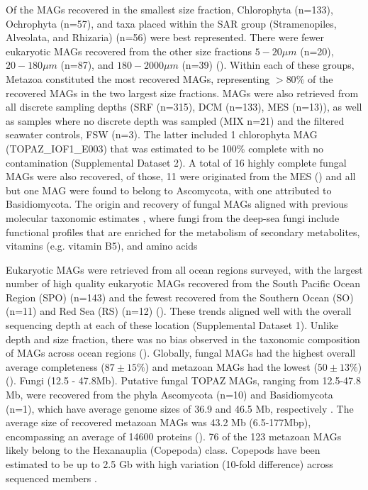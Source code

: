 \documentclass[12pt]{article}
\numberwithin{equation}{section}
\begin{document}
Of the MAGs recovered in the smallest size fraction,  Chlorophyta (n=133), Ochrophyta (n=57), and taxa placed within the SAR group (Stramenopiles, Alveolata, and Rhizaria) (n=56) were best represented. There were fewer eukaryotic MAGs recovered from the other size fractions $5-20\mu m$ (n=20), $20-180 \mu m$ (n=87), and $180-2000\mu m$ (n=39) (). Within each of these groups, Metazoa constituted the most recovered MAGs, representing $>80\%$ of the recovered MAGs in the two largest size fractions. MAGs were also retrieved from all discrete sampling depths (SRF (n=315), DCM (n=133), MES (n=13)), as well as samples where no discrete depth was sampled (MIX n=21) and the filtered seawater controls, FSW (n=3). The latter included 1 chlorophyta MAG (TOPAZ\_IOF1\_E003) that was estimated to be 100\% complete with no contamination (Supplemental Dataset 2). A total of 16 highly complete fungal MAGs were also recovered, of those, 11 were originated from the MES () and all but one MAG were found to belong to Ascomycota, with one attributed to Basidiomycota. The origin and recovery of fungal MAGs aligned with previous molecular taxonomic estimates \citep{Morales_2019,Pernice_2015,Edgcomb_2010}, where fungi from the deep-sea fungi include functional profiles that are enriched for the metabolism of secondary metabolites, vitamins (e.g. vitamin B5), and amino acids \citep{Morales_2019,DAMARE2006172} 

Eukaryotic MAGs were retrieved from all ocean regions surveyed, with the largest number of high quality eukaryotic MAGs recovered from the South Pacific Ocean Region (SPO) (n=143) and the fewest recovered from the Southern Ocean (SO) (n=11) and Red Sea (RS) (n=12) (). These trends aligned well with the overall sequencing depth at each of these location (Supplemental Dataset 1). Unlike depth and size fraction, there was no bias observed in the taxonomic composition of MAGs across ocean regions (). 
Globally, fungal MAGs had the highest overall average completeness ($87 \pm 15\%$) and metazoan MAGs had the lowest ($50 \pm 13\%$) (). Fungi (12.5 - 47.8Mb). Putative fungal TOPAZ MAGs, ranging from 12.5-47.8 Mb, were recovered from the phyla Ascomycota (n=10) and Basidiomycota (n=1), which have average genome sizes of 36.9 and 46.5 Mb, respectively \citep{Mohanta_2015}. The average size of recovered metazoan MAGs was 43.2 Mb (6.5-177Mbp), encompassing an average of 14600 proteins (). 76 of the 123 metazoan MAGs likely belong to the  Hexanauplia (Copepoda) class. Copepods have been estimated to be up to 2.5 Gb with high variation (10-fold difference) across sequenced members \citep{Jorgensen_2019}.  
\end{document}
